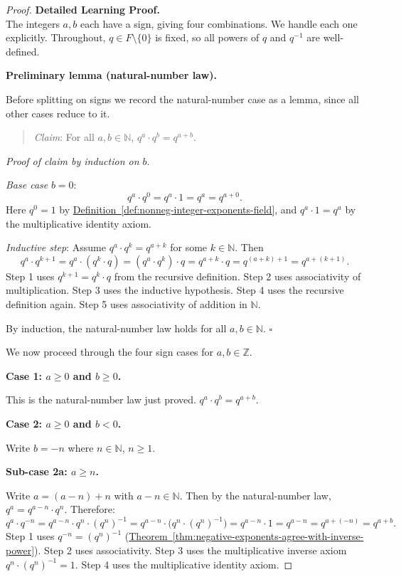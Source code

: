 \begin{proof}
\textbf{Detailed Learning Proof.}~\\

The integers $a,b$ each have a sign, giving four combinations.  We handle
each one explicitly.  Throughout, $q\in F\setminus\{0\}$ is fixed, so all
powers of $q$ and $q^{-1}$ are well-defined.

\textbf{Preliminary lemma (natural-number law).}

Before splitting on signs we record the natural-number case as a lemma, since
all other cases reduce to it.

\begin{quote}
\textit{Claim}: For all $a,b\in\mathbb{N}$, $q^a\cdot q^b = q^{a+b}$.
\end{quote}

\textit{Proof of claim by induction on $b$}.

\textit{Base case} $b=0$:
\[
q^a\cdot q^0 = q^a\cdot 1 = q^a = q^{a+0}.
\]
Here $q^0 = 1$ by \hyperref[def:nonneg-integer-exponents-field]{Definition~\ref*{def:nonneg-integer-exponents-field}},
and $q^a\cdot 1 = q^a$ by the multiplicative identity axiom.

\textit{Inductive step}: Assume $q^a\cdot q^k = q^{a+k}$ for some $k\in\mathbb{N}$.
Then
\[
q^a\cdot q^{k+1}
= q^a\cdot(q^k\cdot q)
= (q^a\cdot q^k)\cdot q
= q^{a+k}\cdot q
= q^{(a+k)+1}
= q^{a+(k+1)}.
\]
Step 1 uses $q^{k+1} = q^k\cdot q$ from the recursive definition.
Step 2 uses associativity of multiplication.
Step 3 uses the inductive hypothesis.
Step 4 uses the recursive definition again.
Step 5 uses associativity of addition in $\mathbb{N}$.

By induction, the natural-number law holds for all $a,b\in\mathbb{N}$.
$\square$

\medskip

We now proceed through the four sign cases for $a,b\in\mathbb{Z}$.

\medskip

\textbf{Case 1: $a\geq 0$ and $b\geq 0$.}

This is the natural-number law just proved.  $q^a\cdot q^b = q^{a+b}$.

\medskip

\textbf{Case 2: $a\geq 0$ and $b < 0$.}

Write $b = -n$ where $n\in\mathbb{N}$, $n\geq 1$.

\textbf{Sub-case 2a: $a\geq n$.}

Write $a = (a-n) + n$ with $a-n\in\mathbb{N}$.  Then by the natural-number law,
$q^a = q^{a-n}\cdot q^n$.  Therefore:
\[
q^a\cdot q^{-n}
= q^{a-n}\cdot q^n\cdot(q^n)^{-1}
= q^{a-n}\cdot\bigl(q^n\cdot(q^n)^{-1}\bigr)
= q^{a-n}\cdot 1
= q^{a-n}
= q^{a+(-n)}
= q^{a+b}.
\]
Step 1 uses $q^{-n} = (q^n)^{-1}$
(\hyperref[thm:negative-exponents-agree-with-inverse-power]{Theorem~\ref*{thm:negative-exponents-agree-with-inverse-power}}).
Step 2 uses associativity.
Step 3 uses the multiplicative inverse axiom $q^n\cdot(q^n)^{-1} = 1$.
Step 4 uses the multiplicative identity axiom.


\end{proof}
